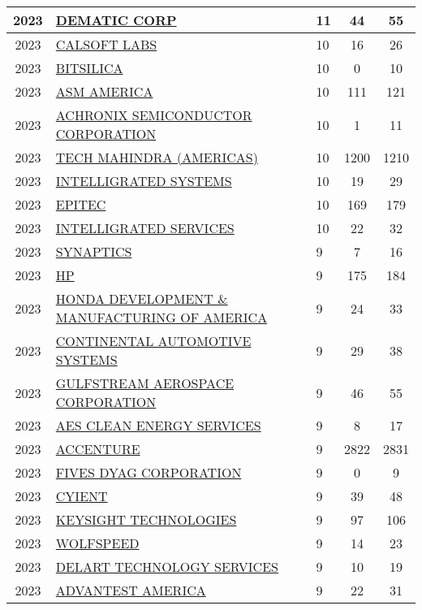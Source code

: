 \documentclass{article}%
\begin{document}
\begin{longtable}{c|p{20em}|p{5em}|c|c}
\hline%
2023&\hyperref[subsec:DEMATICCORP]{DEMATIC CORP}&11&44&55\\%
\hline%
2023&\hyperref[subsec:CALSOFTLABS]{CALSOFT LABS}&10&16&26\\%
\hline%
2023&\hyperref[subsec:BITSILICA]{BITSILICA}&10&0&10\\%
\hline%
2023&\hyperref[subsec:ASMAMERICA]{ASM AMERICA}&10&111&121\\%
\hline%
2023&\hyperref[subsec:ACHRONIXSEMICONDUCTORCORPORATION]{ACHRONIX SEMICONDUCTOR CORPORATION}&10&1&11\\%
\hline%
2023&\hyperref[subsec:TECHMAHINDRA(AMERICAS)]{TECH MAHINDRA (AMERICAS)}&10&1200&1210\\%
\hline%
2023&\hyperref[subsec:INTELLIGRATEDSYSTEMS]{INTELLIGRATED SYSTEMS}&10&19&29\\%
\hline%
2023&\hyperref[subsec:EPITEC]{EPITEC}&10&169&179\\%
\hline%
2023&\hyperref[subsec:INTELLIGRATEDSERVICES]{INTELLIGRATED SERVICES}&10&22&32\\%
\hline%
2023&\hyperref[subsec:SYNAPTICS]{SYNAPTICS}&9&7&16\\%
\hline%
2023&\hyperref[subsec:HP]{HP}&9&175&184\\%
\hline%
2023&\hyperref[subsec:HONDADEVELOPMENTMANUFACTURINGOFAMERICA]{HONDA DEVELOPMENT \& MANUFACTURING OF AMERICA}&9&24&33\\%
\hline%
2023&\hyperref[subsec:CONTINENTALAUTOMOTIVESYSTEMS]{CONTINENTAL AUTOMOTIVE SYSTEMS}&9&29&38\\%
\hline%
2023&\hyperref[subsec:GULFSTREAMAEROSPACECORPORATION]{GULFSTREAM AEROSPACE CORPORATION}&9&46&55\\%
\hline%
2023&\hyperref[subsec:AESCLEANENERGYSERVICES]{AES CLEAN ENERGY SERVICES}&9&8&17\\%
\hline%
2023&\hyperref[subsec:ACCENTURE]{ACCENTURE}&9&2822&2831\\%
\hline%
2023&\hyperref[subsec:FIVESDYAGCORPORATION]{FIVES DYAG CORPORATION}&9&0&9\\%
\hline%
2023&\hyperref[subsec:CYIENT]{CYIENT}&9&39&48\\%
\hline%
2023&\hyperref[subsec:KEYSIGHTTECHNOLOGIES]{KEYSIGHT TECHNOLOGIES}&9&97&106\\%
\hline%
2023&\hyperref[subsec:WOLFSPEED]{WOLFSPEED}&9&14&23\\%
\hline%
2023&\hyperref[subsec:DELARTTECHNOLOGYSERVICES]{DELART TECHNOLOGY SERVICES}&9&10&19\\%
\hline%
2023&\hyperref[subsec:ADVANTESTAMERICA]{ADVANTEST AMERICA}&9&22&31\\%

\end{longtable}
\end{document}
